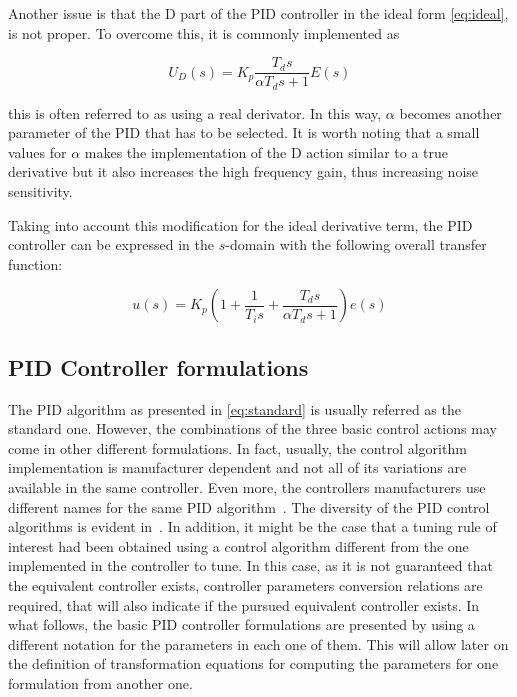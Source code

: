 Another issue is that the D part of the PID controller in the ideal form \eqref{eq:ideal},  is not proper. To overcome this, it is commonly implemented as

\[U_D(s)= K_p\frac{T_ds}{\alpha T_d s+1} E(s)\]

\noindent this is often referred to as using a real derivator. In this way, $\alpha$ becomes another parameter of the PID that has to be selected. It is worth noting that a small values for $\alpha$ makes the implementation of the D action similar to a true derivative but it also increases the high frequency gain, thus increasing noise sensitivity.

Taking into account this modification for the ideal derivative term, the PID controller can be expressed in the $s$-domain with the following overall transfer function:

\begin{equation}
u(s)=K_p \left ( 1+\frac{1}{T_is}+\frac{T_ds}{\alpha T_d s+1} \right )  e(s)
\label{eq:standard}
\end{equation}

\subsection{PID Controller formulations}
\label{sec:3.1}
The PID algorithm as presented in \eqref{eq:standard} is usually referred as the standard one. However, the combinations of the three basic control actions may come in other different formulations. In fact, usually, the control algorithm implementation is manufacturer dependent and not all of its variations are available in the same controller. Even more, the controllers manufacturers use different names for the same PID algorithm~\cite{gerry1987}.  The diversity of the PID control algorithms is evident in~\cite{odwyer2006}.  In addition, it might be the case that a tuning rule of interest had been obtained using a control algorithm different from the one implemented in the controller to tune. In this case, as it is not guaranteed that the equivalent controller exists, controller parameters conversion relations are required, that will also indicate if the pursued equivalent controller exists. In what follows, the basic PID controller formulations are presented by using a different notation for the parameters in each one of them. This will allow later on the definition of transformation equations for computing the parameters for one formulation from another one.

